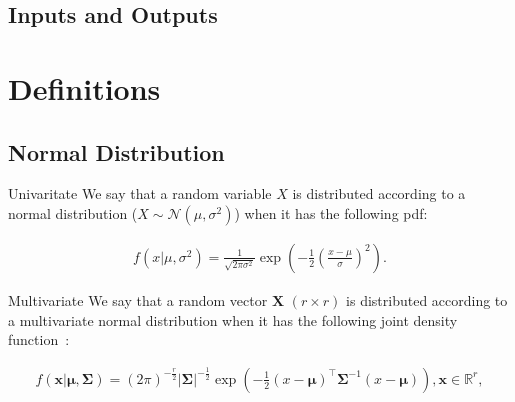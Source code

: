 \documentclass[10pt]{beamer}
\begin{document}
    \begin{frame}{}

    \end{frame}

    \subsection{Inputs and Outputs}\label{subsec:inputs-and-outputs}

    \begin{frame}{}

    \end{frame}


    \section{Definitions}\label{sec:definitions}

    \subsection{Normal Distribution}\label{subsec:normal-distribution}

    \begin{frame}{Univaritate}
        We say that a random variable $X$ is distributed
        according to a normal distribution ($X \sim \mathcal{N}(\mu, \sigma^2)$) when it has the following pdf:

        \begin{definition}
            \begin{align*}
                \label{eq:pdf_normal_dist}
                f(x|\mu, \sigma^2) = \frac{1}{\sqrt{2\pi\sigma^2}}
                \exp{\left(-\frac{1}{2}\left(\frac{x-\mu}{\sigma}\right)^2\right)}.
            \end{align*}
        \end{definition}
    \end{frame}

    \begin{frame}{Multivariate}
        We say that a random vector $\bm{X}$ $(r \times r)$
        is distributed according to a multivariate normal distribution
        when it has the following joint density function~\autocite[p. 59]{izenman_modern_2008}:
        \begin{definition}
            \begin{align}
                f(\bm{x}| \bm{\mu}, \bm{\Sigma})
                = (2\pi)^{-\frac{r}{2}}
                \left|\bm{\Sigma}\right|^{-\frac{1}{2}}
                \exp\left(-\frac{1}{2}(x-\bm{\mu})^\top \bm{\Sigma}^{-1} (x-\bm{\mu})\right),
                \bm{x} \in \mathbb{R}^r,
            \end{align}
        \end{definition}
    \end{frame}
\end{document}
